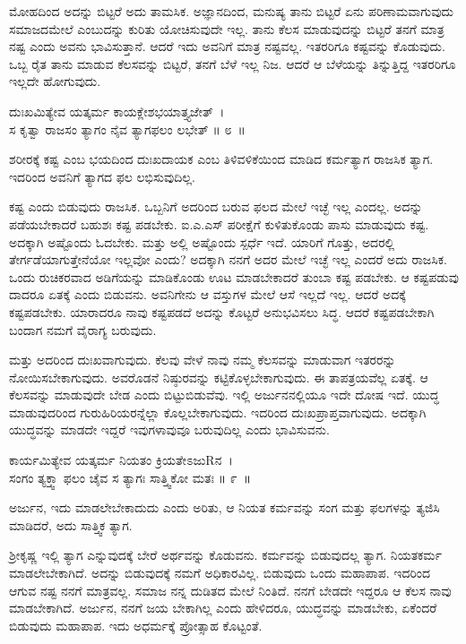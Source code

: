 ಮೋಹದಿಂದ ಅದನ್ನು ಬಿಟ್ಟರೆ ಅದು ತಾಮಸಿಕ. ಅಜ್ಞಾನದಿಂದ, ಮನುಷ್ಯ ತಾನು ಬಿಟ್ಟರೆ ಏನು ಪರಿಣಾಮವಾಗುವುದು ಸಮಾಜದಮೇಲೆ ಎಂಬುದನ್ನು ಕುರಿತು ಯೋಚಿಸುವುದೇ ಇಲ್ಲ. ತಾನು ಕೆಲಸ ಮಾಡುವುದನ್ನು ಬಿಟ್ಟರೆ ತನಗೆ ಮಾತ್ರ ನಷ್ಟ ಎಂದು ಅವನು ಭಾವಿಸುತ್ತಾನೆ. ಆದರೆ ಇದು ಅವನಿಗೆ ಮಾತ್ರ ನಷ್ಟವಲ್ಲ. ಇತರರಿಗೂ ಕಷ್ಟವನ್ನು ಕೊಡುವುದು. ಒಬ್ಬ ರೈತ ತಾನು ಮಾಡುವ ಕೆಲಸವನ್ನು ಬಿಟ್ಟರೆ, ತನಗೆ ಬೆಳೆ ಇಲ್ಲ ನಿಜ. ಆದರೆ ಆ ಬೆಳೆಯನ್ನು ತಿನ್ನುತ್ತಿದ್ದ ಇತರರಿಗೂ ಇಲ್ಲದೇ ಹೋಗುವುದು.

\begin{shloka}
ದುಃಖಮಿತ್ಯೇವ ಯತ್ಕರ್ಮ ಕಾಯಕ್ಲೇಶಭಯಾತ್ತ್ಯಜೇತ್~।\\ಸ ಕೃತ್ವಾ ರಾಜಸಂ ತ್ಯಾಗಂ ನೈವ ತ್ಯಾಗಫಲಂ ಲಭೇತ್ \hfill॥ ೮~॥
\end{shloka}

\begin{artha}
ಶರೀರಕ್ಕೆ ಕಷ್ಟ ಎಂಬ ಭಯದಿಂದ ದುಃಖದಾಯಕ ಎಂಬ ತಿಳಿವಳಿಕೆಯಿಂದ ಮಾಡಿದ ಕರ್ಮತ್ಯಾಗ ರಾಜಸಿಕ ತ್ಯಾಗ. ಇದರಿಂದ ಅವನಿಗೆ ತ್ಯಾಗದ ಫಲ ಲಭಿಸುವುದಿಲ್ಲ.
\end{artha}

ಕಷ್ಟ ಎಂದು ಬಿಡುವುದು ರಾಜಸಿಕ. ಒಬ್ಬನಿಗೆ ಅದರಿಂದ ಬರುವ ಫಲದ ಮೇಲೆ ಇಚ್ಛೆ ಇಲ್ಲ ಎಂದಲ್ಲ. ಅದನ್ನು ಪಡೆಯಬೇಕಾದರೆ ಬಹುಶಃ ಕಷ್ಟ ಪಡಬೇಕು. ಐ.ಎ.ಎಸ್ ಪರೀಕ್ಷೆಗೆ ಕುಳಿತುಕೊಂಡು ಪಾಸು ಮಾಡುವುದು ಕಷ್ಟ. ಅದಕ್ಕಾಗಿ ಅಷ್ಟೊಂದು ಓದಬೇಕು. ಮತ್ತು ಅಲ್ಲಿ ಅಷ್ಟೊಂದು ಸ್ಪರ್ಧೆ ಇದೆ. ಯಾರಿಗೆ ಗೊತ್ತು, ಅದರಲ್ಲಿ ತೇರ್ಗಡೆಯಾಗುತ್ತೇನೆಯೋ ಇಲ್ಲವೋ ಎಂದು? ಅದಕ್ಕಾಗಿ ನನಗೆ ಅದರ ಮೇಲೆ ಇಚ್ಛೆ ಇಲ್ಲ ಎಂದರೆ ಅದು ರಾಜಸಿಕ. ಒಂದು ರುಚಿಕರವಾದ ಅಡಿಗೆಯನ್ನು ಮಾಡಿಕೊಂಡು ಊಟ ಮಾಡಬೇಕಾದರೆ ತುಂಬಾ ಕಷ್ಟ ಪಡಬೇಕು. ಆ ಕಷ್ಟಪಡುವು ದಾದರೂ ಏತಕ್ಕೆ ಎಂದು ಬಿಡುವನು. ಅವನಿಗೇನು ಆ ವಸ್ತುಗಳ ಮೇಲೆ ಆಸೆ ಇಲ್ಲದೆ ಇಲ್ಲ. ಆದರೆ ಅದಕ್ಕೆ ಕಷ್ಟಪಡಬೇಕು. ಯಾರಾದರೂ ನಾವು ಕಷ್ಟಪಡದೆ ಅದನ್ನು ಕೊಟ್ಟರೆ ಅನುಭವಿಸಲು ಸಿದ್ಧ. ಆದರೆ ಕಷ್ಟಪಡಬೇಕಾಗಿ ಬಂದಾಗ ನಮಗೆ ವೈರಾಗ್ಯ ಬರುವುದು.

ಮತ್ತು ಅದರಿಂದ ದುಃಖವಾಗುವುದು. ಕೆಲವು ವೇಳೆ ನಾವು ನಮ್ಮ ಕೆಲಸವನ್ನು ಮಾಡುವಾಗ ಇತರರನ್ನು ನೋಯಿಸಬೇಕಾಗುವುದು. ಅವರೊಡನೆ ನಿಷ್ಠುರವನ್ನು ಕಟ್ಟಿಕೊಳ್ಳಬೇಕಾಗುವುದು. ಈ ತಾಪತ್ರಯವೆಲ್ಲ ಏತಕ್ಕೆ. ಆ ಕೆಲಸವನ್ನು ಮಾಡುವುದೇ ಬೇಡ ಎಂದು ಬಿಟ್ಟುಬಿಡುವೆವು. ಇಲ್ಲಿ ಅರ್ಜುನನಲ್ಲಿಯೂ ಇದೇ ದೋಷ ಇದೆ. ಯುದ್ಧ ಮಾಡುವುದರಿಂದ ಗುರುಹಿರಿಯರನ್ನೆಲ್ಲಾ ಕೊಲ್ಲಬೇಕಾಗುವುದು. ಇದರಿಂದ ದುಃಖಪ್ರಾಪ್ತವಾಗುವುದು. ಅದಕ್ಕಾಗಿ ಯುದ್ಧವನ್ನು ಮಾಡದೇ ಇದ್ದರೆ ಇವುಗಳಾವುವೂ ಬರುವುದಿಲ್ಲ ಎಂದು ಭಾವಿಸುವನು.

\begin{shloka}
ಕಾರ್ಯಮಿತ್ಯೇವ ಯತ್ಕರ್ಮ ನಿಯತಂ ಕ್ರಿಯತೇಽಜುRನ~।\\ಸಂಗಂ ತ್ಯಕ್ತ್ವಾ ಫಲಂ ಚೈವ ಸ ತ್ಯಾಗಃ ಸಾತ್ತ್ವಿಕೋ ಮತಃ \hfill॥ ೯~॥
\end{shloka}

\begin{artha}
ಅರ್ಜುನ, ಇದು ಮಾಡಲೇಬೇಕಾದುದು ಎಂದು ಅರಿತು, ಆ ನಿಯತ ಕರ್ಮವನ್ನು ಸಂಗ ಮತ್ತು ಫಲಗಳನ್ನು ತ್ಯಜಿಸಿ ಮಾಡಿದರೆ, ಅದು ಸಾತ್ತ್ವಿಕ ತ್ಯಾಗ. 
\end{artha}

ಶ‍್ರೀಕೃಷ್ಣ ಇಲ್ಲಿ ತ್ಯಾಗ ಎನ್ನುವುದಕ್ಕೆ ಬೇರೆ ಅರ್ಥವನ್ನು ಕೊಡುವನು. ಕರ್ಮವನ್ನು ಬಿಡುವು\-ದಲ್ಲ ತ್ಯಾಗ. ನಿಯತಕರ್ಮ ಮಾಡಲೇಬೇಕಾಗಿದೆ. ಅದನ್ನು ಬಿಡುವುದಕ್ಕೆ ನಮಗೆ ಅಧಿಕಾರವಿಲ್ಲ. ಬಿಡುವುದು ಒಂದು ಮಹಾಪಾಪ. ಇದರಿಂದ ಆಗುವ ನಷ್ಟ ನನಗೆ ಮಾತ್ರವಲ್ಲ. ಸಮಾಜ ನನ್ನ ದುಡಿತದ ಮೇಲೆ ನಿಂತಿದೆ. ನನಗೆ ಬೇಡದೇ ಇದ್ದರೂ ಆ ಕೆಲಸ ನಾವು ಮಾಡಬೇಕಾಗಿದೆ. ಅರ್ಜುನ, ನನಗೆ ಜಯ ಬೇಕಾಗಿಲ್ಲ ಎಂದು ಹೇಳಿದರೂ, ಯುದ್ಧವನ್ನು ಮಾಡಬೇಕು, ಏಕೆಂದರೆ ಬಿಡುವುದು ಮಹಾಪಾಪ. ಇದು ಅಧರ್ಮಕ್ಕೆ ಪ್ರೋತ್ಸಾಹ ಕೊಟ್ಟಂತೆ.

